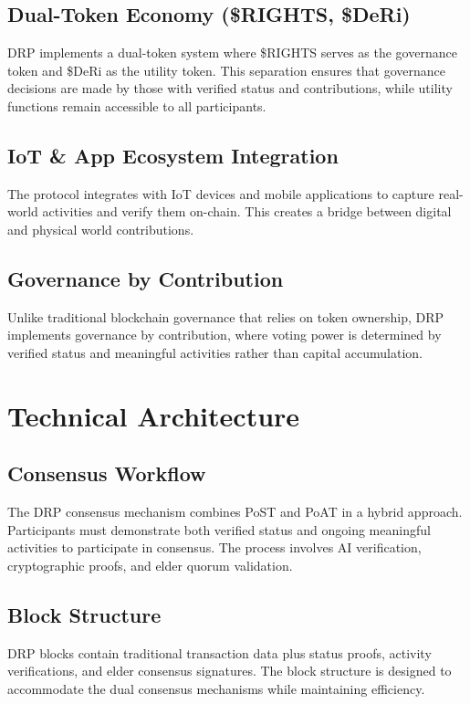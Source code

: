 \documentclass[11pt,a4paper]{article}
\begin{document}
\subsection{Dual-Token Economy (\$RIGHTS, \$DeRi)}
DRP implements a dual-token system where \$RIGHTS serves as the governance token and \$DeRi as the utility token. This separation ensures that governance decisions are made by those with verified status and contributions, while utility functions remain accessible to all participants.

\subsection{IoT \& App Ecosystem Integration}
The protocol integrates with IoT devices and mobile applications to capture real-world activities and verify them on-chain. This creates a bridge between digital and physical world contributions.

\subsection{Governance by Contribution}
Unlike traditional blockchain governance that relies on token ownership, DRP implements governance by contribution, where voting power is determined by verified status and meaningful activities rather than capital accumulation.


\section{Technical Architecture}

\subsection{Consensus Workflow}
The DRP consensus mechanism combines PoST and PoAT in a hybrid approach. Participants must demonstrate both verified status and ongoing meaningful activities to participate in consensus. The process involves AI verification, cryptographic proofs, and elder quorum validation.

\subsection{Block Structure}
DRP blocks contain traditional transaction data plus status proofs, activity verifications, and elder consensus signatures. The block structure is designed to accommodate the dual consensus mechanisms while maintaining efficiency.
\end{document}
